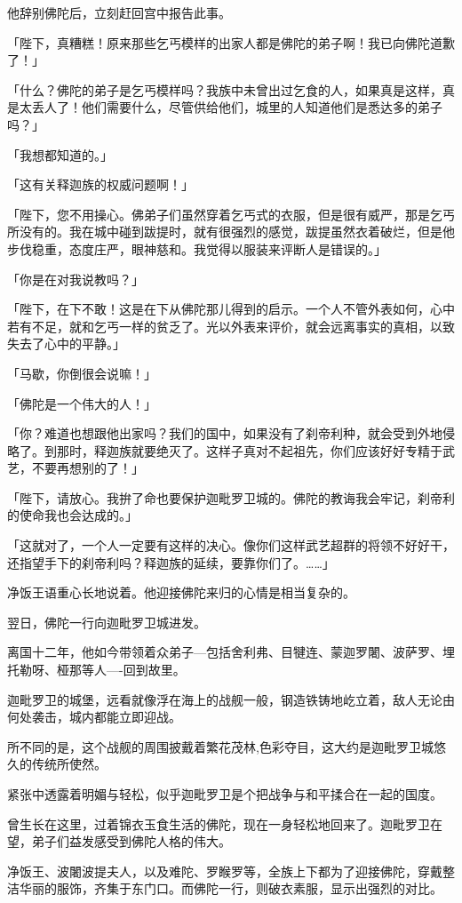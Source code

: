 \documentclass[twoside,openany]{book}
\begin{document}
他辞别佛陀后，立刻赶回宫中报告此事。

「陛下，真糟糕！原来那些乞丐模样的出家人都是佛陀的弟子啊！我已向佛陀道歉了！」

「什么？佛陀的弟子是乞丐模样吗？我族中未曾出过乞食的人，如果真是这样，真是太丢人了！他们需要什么，尽管供给他们，城里的人知道他们是悉达多的弟子吗？」

「我想都知道的。」

「这有关释迦族的权威问题啊！」

「陛下，您不用操心。佛弟子们虽然穿着乞丐式的衣服，但是很有威严，那是乞丐所没有的。我在城中碰到跋提时，就有很强烈的感觉，跋提虽然衣着破烂，但是他步伐稳重，态度庄严，眼神慈和。我觉得以服装来评断人是错误的。」

「你是在对我说教吗？」

「陛下，在下不敢！这是在下从佛陀那儿得到的启示。一个人不管外表如何，心中若有不足，就和乞丐一样的贫乏了。光以外表来评价，就会远离事实的真相，以致失去了心中的平静。」

「马歇，你倒很会说嘛！」

「佛陀是一个伟大的人！」

「你？难道也想跟他出家吗？我们的国中，如果没有了刹帝利种，就会受到外地侵略了。到那时，释迦族就要绝灭了。这样子真对不起祖先，你们应该好好专精于武艺，不要再想别的了！」

「陛下，请放心。我拚了命也要保护迦毗罗卫城的。佛陀的教诲我会牢记，刹帝利的使命我也会达成的。」

「这就对了，一个人一定要有这样的决心。像你们这样武艺超群的将领不好好干，还指望手下的刹帝利吗？释迦族的延续，要靠你们了。……」

净饭王语重心长地说着。他迎接佛陀来归的心情是相当复杂的。

翌日，佛陀一行向迦毗罗卫城进发。

离国十二年，他如今带领着众弟子---包括舍利弗、目犍连、蒙迦罗闍、波萨罗、埋托勒呀、桠那等人----回到故里。

迦毗罗卫的城堡，远看就像浮在海上的战舰一般，钢造铁铸地屹立着，敌人无论由何处袭击，城内都能立即迎战。

所不同的是，这个战舰的周围披戴着繁花茂林,色彩夺目，这大约是迦毗罗卫城悠久的传统所使然。

紧张中透露着明媚与轻松，似乎迦毗罗卫是个把战争与和平揉合在一起的国度。

曾生长在这里，过着锦衣玉食生活的佛陀，现在一身轻松地回来了。迦毗罗卫在望，弟子们益发感受到佛陀人格的伟大。

净饭王、波闍波提夫人，以及难陀、罗睺罗等，全族上下都为了迎接佛陀，穿戴整洁华丽的服饰，齐集于东门口。而佛陀一行，则破衣素服，显示出强烈的对比。
\end{document}
